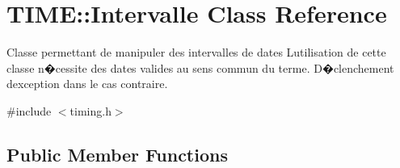 \hypertarget{class_t_i_m_e_1_1_intervalle}{}\section{T\+I\+M\+E\+:\+:Intervalle Class Reference}
\label{class_t_i_m_e_1_1_intervalle}


Classe permettant de manipuler des intervalles de dates L\textquotesingle{}utilisation de cette classe n�cessite des dates valides au sens commun du terme. D�clenchement d\textquotesingle{}exception dans le cas contraire.  




{\ttfamily \#include $<$timing.\+h$>$}

\subsection*{Public Member Functions}
